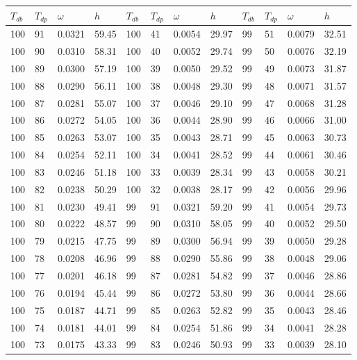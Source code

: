 \begin{tabular}{llll|llll|llll}
 \toprule 
\(T_{db}\) & \(T_{dp}\) & \(\omega\) & \(h\) & \(T_{db}\) & \(T_{dp}\) & \(\omega\) & \(h\) & \(T_{db}\) & \(T_{dp}\) & \(\omega\) & \(h\)  \\ \midrule 
100 & 91 & 0.0321 & 59.45 & 100 & 41 & 0.0054 & 29.97 & 99 & 51 & 0.0079 & 32.51\\
100 & 90 & 0.0310 & 58.31 & 100 & 40 & 0.0052 & 29.74 & 99 & 50 & 0.0076 & 32.19\\
100 & 89 & 0.0300 & 57.19 & 100 & 39 & 0.0050 & 29.52 & 99 & 49 & 0.0073 & 31.87\\
100 & 88 & 0.0290 & 56.11 & 100 & 38 & 0.0048 & 29.30 & 99 & 48 & 0.0071 & 31.57\\
100 & 87 & 0.0281 & 55.07 & 100 & 37 & 0.0046 & 29.10 & 99 & 47 & 0.0068 & 31.28\\
100 & 86 & 0.0272 & 54.05 & 100 & 36 & 0.0044 & 28.90 & 99 & 46 & 0.0066 & 31.00\\
100 & 85 & 0.0263 & 53.07 & 100 & 35 & 0.0043 & 28.71 & 99 & 45 & 0.0063 & 30.73\\
100 & 84 & 0.0254 & 52.11 & 100 & 34 & 0.0041 & 28.52 & 99 & 44 & 0.0061 & 30.46\\
100 & 83 & 0.0246 & 51.18 & 100 & 33 & 0.0039 & 28.34 & 99 & 43 & 0.0058 & 30.21\\
100 & 82 & 0.0238 & 50.29 & 100 & 32 & 0.0038 & 28.17 & 99 & 42 & 0.0056 & 29.96\\
100 & 81 & 0.0230 & 49.41 & 99 & 91 & 0.0321 & 59.20 & 99 & 41 & 0.0054 & 29.73\\
100 & 80 & 0.0222 & 48.57 & 99 & 90 & 0.0310 & 58.05 & 99 & 40 & 0.0052 & 29.50\\
100 & 79 & 0.0215 & 47.75 & 99 & 89 & 0.0300 & 56.94 & 99 & 39 & 0.0050 & 29.28\\
100 & 78 & 0.0208 & 46.96 & 99 & 88 & 0.0290 & 55.86 & 99 & 38 & 0.0048 & 29.06\\
100 & 77 & 0.0201 & 46.18 & 99 & 87 & 0.0281 & 54.82 & 99 & 37 & 0.0046 & 28.86\\
100 & 76 & 0.0194 & 45.44 & 99 & 86 & 0.0272 & 53.80 & 99 & 36 & 0.0044 & 28.66\\
100 & 75 & 0.0187 & 44.71 & 99 & 85 & 0.0263 & 52.82 & 99 & 35 & 0.0043 & 28.46\\
100 & 74 & 0.0181 & 44.01 & 99 & 84 & 0.0254 & 51.86 & 99 & 34 & 0.0041 & 28.28\\
100 & 73 & 0.0175 & 43.33 & 99 & 83 & 0.0246 & 50.93 & 99 & 33 & 0.0039 & 28.10\\

\end{tabular}
